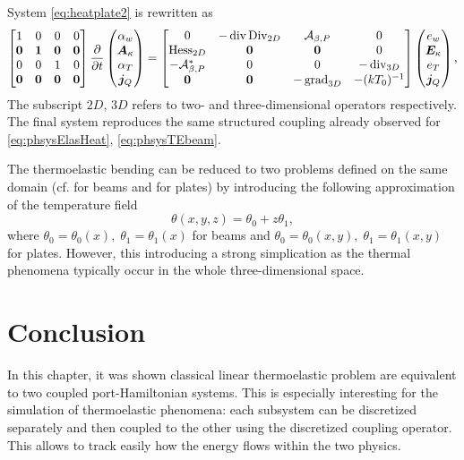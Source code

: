 System \eqref{eq:heatplate2} is rewritten as
\begin{equation}\label{eq:phsysTEplate}
\begin{bmatrix}
1 & 0 & 0 & 0\\
\bm{0} & \bm{1} & \bm{0} & \bm{0} \\
0 & 0 & 1 & 0\\
\bm{0} & \bm{0} & \bm{0} & \bm{0} \\
\end{bmatrix}
\diffp{}{t}
\begin{pmatrix}
\alpha_w \\
\bm{A}_\kappa \\
{\alpha}_T \\
\bm{j}_Q \\
\end{pmatrix} = 
\begin{bmatrix}
{0} & -\div\Div_{2D} & \mathcal{A}_{\beta, P} & {0}\\
{\Hess}_{2D} & \bm{0} & \bm{0} & {0} \\
-\mathcal{A}_{\beta, P}^* & 0 & 0 & -\div_{3D} \\
\bm{0} & \bm{0} & -\grad_{3D} & - (k T_0)^{-1} \\
\end{bmatrix}
\begin{pmatrix}
e_w \\
\bm{E}_\kappa \\
e_T \\
\bm{j}_Q \\
\end{pmatrix},
\end{equation}
The subscript $2D,\, 3D$ refers to two- and three-dimensional operators respectively. The final system reproduces the same structured coupling already observed for \eqref{eq:phsysElasHeat}, \eqref{eq:phsysTEbeam}. 

\begin{remark}
The thermoelastic bending  can be reduced to two problems defined on the same domain (cf. \cite{hansen1997boundary} for beams and \cite{avalos2000} for plates) by introducing the following approximation of the temperature field
\begin{equation}
	\theta(x,y,z) = \theta_0 + z \theta_1,
\end{equation}
where $\theta_0 = \theta_0(x), \; \theta_1 = \theta_1(x)$ for beams and $\theta_0 = \theta_0(x,y), \; \theta_1 = \theta_1(x,y)$ for plates. However, this introducing a strong simplication as the thermal phenomena typically occur in the whole three-dimensional space.
\end{remark}

\section{Conclusion}
In this chapter, it was shown classical linear thermoelastic problem are equivalent to two coupled port-Hamiltonian systems. This is especially interesting for the simulation of thermoelastic phenomena: each subsystem can be discretized separately and then coupled to the other using the discretized coupling operator. This allows to track easily how the energy flows within the two physics. 




